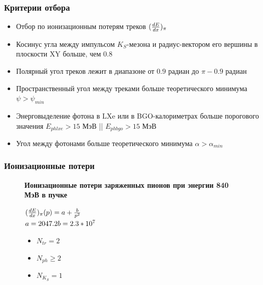 \documentclass[14pt, hyperref = {colorlinks}]{beamer}
\begin{document}
\begin{frame}\label{r}
\frametitle{Критерии отбора}
\begin{itemize}
  \item {Отбор по ионизационным потерям треков {$({dE\over{dx}})_{\pi}$}} %
  \item {Косинус угла между импульсом $K_{S}$-мезона и радиус-вектором его вершины в плоскости XY больше, чем {$0.8$}}
  \item {Полярный угол треков лежит в диапазоне от $0.9$ радиан до $\pi-0.9$ радиан}
  \item {Пространственный угол между треками больше теоретического минимума {$\psi > \psi_{min}$}}
  \item {Энерговыделение фотона в LXe или в BGO-калориметрах больше порогового значения {$E_{phlxe} > 15$ МэВ || $E_{phbgo} > 15$ МэВ}}
  \item {Угол между фотонами больше теоретического минимума {$\alpha > \alpha_{min}$}}
\end{itemize}
\end{frame}

\begin{frame}\label{r3}
\frametitle{Ионизационные потери}
\begin{figure}[h]
\center\textbf{Ионизационные потери заряженных пионов при энергии 840 МэВ в пучке}
\begin{minipage}[h]{0.69\linewidth}
\end{minipage}
\hfill
\begin{minipage}[h]{0.29\linewidth}
    \small{$({dE\over{dx}})_{\pi}(p) = a + {b\over{p^{2}}}$
    \\$a = 2047.2\\b = 2.3*10^{7}$}
    \begin{itemize}
        \item {$N_{tr} = 2$}
        \item {$N_{ph} \geq 2$}
        \item {$N_{K_{S}} = 1$}
    \end{itemize}
\end{minipage}
\end{figure}
\end{frame}
\end{document}
